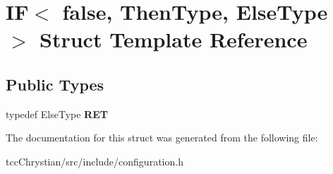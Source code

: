 \hypertarget{structIF_3_01false_00_01ThenType_00_01ElseType_01_4}{\section{I\-F$<$ false, Then\-Type, Else\-Type $>$ Struct Template Reference}
\label{structIF_3_01false_00_01ThenType_00_01ElseType_01_4}
}
\subsection*{Public Types}
\begin{DoxyCompactItemize}
\item 
\hypertarget{structIF_3_01false_00_01ThenType_00_01ElseType_01_4_aa7d9ee5d71d3235a17de49470e2a00a0}{typedef Else\-Type {\bfseries R\-E\-T}}\label{structIF_3_01false_00_01ThenType_00_01ElseType_01_4_aa7d9ee5d71d3235a17de49470e2a00a0}

\end{DoxyCompactItemize}


The documentation for this struct was generated from the following file\-:\begin{DoxyCompactItemize}
\item 
tcc\-Chrystian/src/include/configuration.\-h\end{DoxyCompactItemize}

